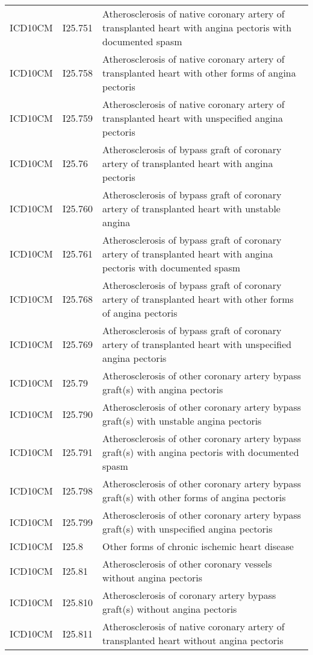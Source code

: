 \begin{longtable}{p{}p{}p{}}
  ICD10CM & I25.751 & Atherosclerosis of native coronary artery of transplanted heart with angina pectoris with documented spasm \\ 
  ICD10CM & I25.758 & Atherosclerosis of native coronary artery of transplanted heart with other forms of angina pectoris \\ 
  ICD10CM & I25.759 & Atherosclerosis of native coronary artery of transplanted heart with unspecified angina pectoris \\ 
  ICD10CM & I25.76 & Atherosclerosis of bypass graft of coronary artery of transplanted heart with angina pectoris \\ 
  ICD10CM & I25.760 & Atherosclerosis of bypass graft of coronary artery of transplanted heart with unstable angina \\ 
  ICD10CM & I25.761 & Atherosclerosis of bypass graft of coronary artery of transplanted heart with angina pectoris with documented spasm \\ 
  ICD10CM & I25.768 & Atherosclerosis of bypass graft of coronary artery of transplanted heart with other forms of angina pectoris \\ 
  ICD10CM & I25.769 & Atherosclerosis of bypass graft of coronary artery of transplanted heart with unspecified angina pectoris \\ 
  ICD10CM & I25.79 & Atherosclerosis of other coronary artery bypass graft(s) with angina pectoris \\ 
  ICD10CM & I25.790 & Atherosclerosis of other coronary artery bypass graft(s) with unstable angina pectoris \\ 
  ICD10CM & I25.791 & Atherosclerosis of other coronary artery bypass graft(s) with angina pectoris with documented spasm \\ 
  ICD10CM & I25.798 & Atherosclerosis of other coronary artery bypass graft(s) with other forms of angina pectoris \\ 
  ICD10CM & I25.799 & Atherosclerosis of other coronary artery bypass graft(s) with unspecified angina pectoris \\ 
  ICD10CM & I25.8 & Other forms of chronic ischemic heart disease \\ 
  ICD10CM & I25.81 & Atherosclerosis of other coronary vessels without angina pectoris \\ 
  ICD10CM & I25.810 & Atherosclerosis of coronary artery bypass graft(s) without angina pectoris \\ 
  ICD10CM & I25.811 & Atherosclerosis of native coronary artery of transplanted heart without angina pectoris \\ 

\end{longtable}
